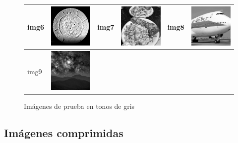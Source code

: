 \documentclass{article}
\begin{document}
\begin{figure}[!htp]
\begin{center}
\begin{tabular}[t]{|ll|ll|ll|}
\hline
img6 & \includegraphics[width=3cm]{../imgs/input/imgs_gray/img06.png} &
img7 & \includegraphics[width=3cm]{../imgs/input/imgs_gray/img07.png} &
img8 & \includegraphics[width=3cm]{../imgs/input/imgs_gray/img08.png} \\
\hline
img9 & \includegraphics[width=3cm]{../imgs/input/imgs_gray/img09.png} &&&& \\
\hline
\end{tabular}
\end{center}
\caption{Imágenes de prueba en tonos de gris}
\label{fig:imagenes_de_prueba_gris}
\end{figure}

\newpage
\subsection{Imágenes comprimidas}
\end{document}
